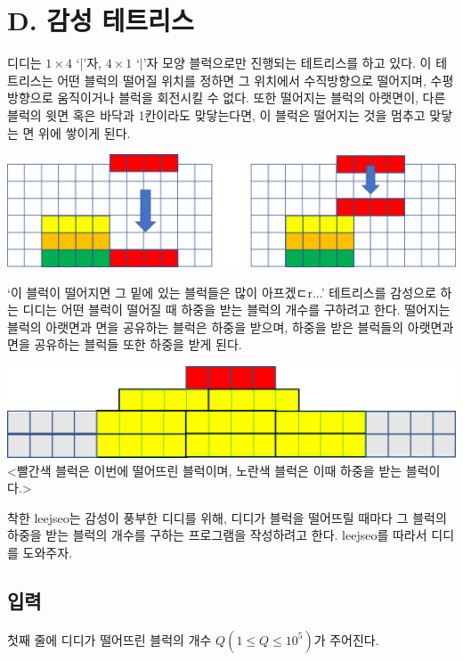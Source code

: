 \documentclass{article}
\begin{document}
\newpage

\section{D. 감성 테트리스}
디디는 $1 \times 4$ `|'자, $4 \times 1$ `$|$'자 모양 블럭으로만 진행되는 테트리스를 하고 있다. 이 테트리스는 어떤 블럭의 떨어질 위치를 정하면 그 위치에서 수직방향으로 떨어지며, 수평방향으로 움직이거나 블럭을 회전시킬 수 없다. 또한 떨어지는 블럭의 아랫면이, 다른 블럭의 윗면 혹은 바닥과 1칸이라도 맞닿는다면, 이 블럭은 떨어지는 것을 멈추고 맞닿는 면 위에 쌓이게 된다.\newline

\begin{center}
	\includegraphics[scale=0.27]{images/02.png}
\end{center}

`이 블럭이 떨어지면 그 밑에 있는 블럭들은 많이 아프겠ㄷr...' 테트리스를 감성으로 하는 디디는 어떤 블럭이 떨어질 때 하중을 받는 블럭의 개수를 구하려고 한다. 떨어지는 블럭의 아랫면과 면을 공유하는 블럭은 하중을 받으며, 하중을 받은 블럭들의 아랫면과 면을 공유하는 블럭들 또한 하중을 받게 된다.\newline

\begin{center}
	\includegraphics[scale=0.27]{images/03.png}\newline
	\textless 빨간색 블럭은 이번에 떨어뜨린 블럭이며, 노란색 블럭은 이때 하중을 받는 블럭이다.\textgreater
\end{center}

착한 leejseo는 감성이 풍부한 디디를 위해, 디디가 블럭을 떨어뜨릴 때마다 그 블럭의 하중을 받는 블럭의 개수를 구하는 프로그램을 작성하려고 한다. leejseo를 따라서 디디를 도와주자.\newline

\subsection{입력}
첫째 줄에 디디가 떨어뜨린 블럭의 개수 $Q(1 \le Q \le 10^5)$가 주어진다.
\end{document}
